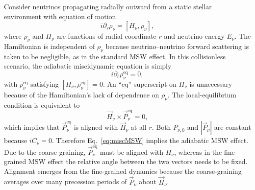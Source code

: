 \documentclass[aps,prd,twocolumn,groupedaddress,preprintnumbers]{revtex4-2}
\begin{document}
Consider neutrinos propagating radially outward from a static stellar environment with equation of motion
\begin{equation}
    i \partial_r \rho_\nu = [H_\nu, \rho_\nu],
\end{equation}
where $\rho_\nu$ and $H_\nu$ are functions of radial coordinate $r$ and neutrino energy $E_\nu$. The Hamiltonian is independent of $\rho_\nu$ because neutrino--neutrino forward scattering is taken to be negligible, as in the standard MSW effect. In this collisionless scenario, the adiabatic miscidynamic equation is simply
\begin{equation}
    i \partial_r \rho_\nu^\textrm{eq} = 0, \label{eq:miscMSW}
\end{equation}
with $\rho_\nu^{\textrm{eq}}$ satisfying $[ H_\nu, \rho_\nu^{\textrm{eq}}] = 0$. An ``eq'' superscript on $H_\nu$ is unnecessary because of the Hamiltonian's lack of dependence on $\rho_\nu$. The local-equilibrium condition is equivalent to
\begin{equation}
    \vec{H}_\nu \times \vec{P}_\nu^{\textrm{eq}} = 0,
\end{equation}
which implies that $\vec{P}_\nu^{\textrm{eq}}$ is aligned with $\vec{H}_\nu$ at all $r$. Both $P_{\nu,0}$ and $|\vec{P}_\nu|$ are constant because $iC_\nu = 0$. Therefore Eq.~\eqref{eq:miscMSW} implies the adiabatic MSW effect. Due to the coarse-graining, $\vec{P}^{\textrm{eq}}_\nu$ must be aligned with $H_\nu$, whereas in the fine-grained MSW effect the relative angle between the two vectors needs to be fixed. Alignment emerges from the fine-grained dynamics because the coarse-graining averages over many precession periods of $\vec{P}_\nu$ about $\vec{H}_\nu$.
\end{document}
